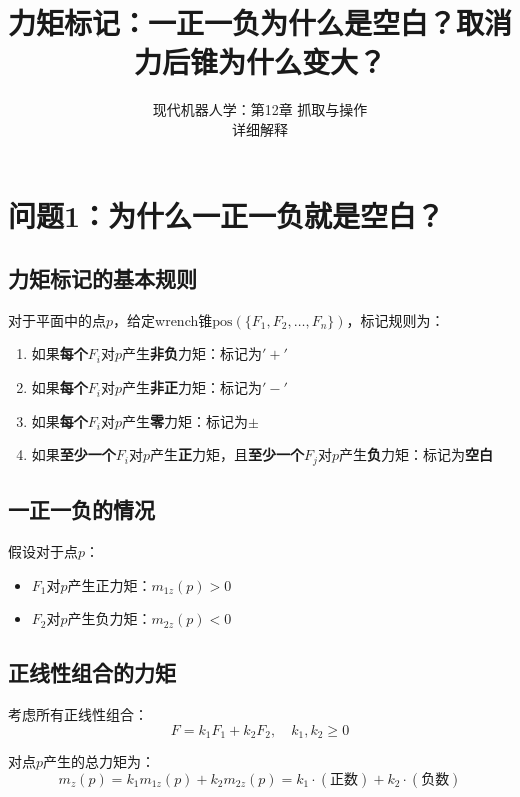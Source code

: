 \documentclass[12pt,a4paper]{article}
\title{力矩标记：一正一负为什么是空白？取消力后锥为什么变大？}
\author{现代机器人学：第12章 抓取与操作\\
详细解释}
\date{}
\begin{document}
\maketitle

\section{问题1：为什么一正一负就是空白？}

\subsection{力矩标记的基本规则}

对于平面中的点$p$，给定wrench锥$\text{pos}(\{F_1, F_2, \ldots, F_n\})$，标记规则为：

\begin{enumerate}
    \item 如果\textbf{每个}$F_i$对$p$产生\textbf{非负}力矩：标记为$'+'$
    \item 如果\textbf{每个}$F_i$对$p$产生\textbf{非正}力矩：标记为$'-'$
    \item 如果\textbf{每个}$F_i$对$p$产生\textbf{零}力矩：标记为$\pm$
    \item 如果\textbf{至少一个}$F_i$对$p$产生\textbf{正}力矩，且\textbf{至少一个}$F_j$对$p$产生\textbf{负}力矩：标记为\textbf{空白}
\end{enumerate}

\subsection{一正一负的情况}

假设对于点$p$：
\begin{itemize}
    \item $F_1$对$p$产生正力矩：$m_{1z}(p) > 0$
    \item $F_2$对$p$产生负力矩：$m_{2z}(p) < 0$
\end{itemize}

\subsection{正线性组合的力矩}

考虑所有正线性组合：
\begin{equation}
F = k_1 F_1 + k_2 F_2, \quad k_1, k_2 \geq 0
\end{equation}

对点$p$产生的总力矩为：
\begin{equation}
m_z(p) = k_1 m_{1z}(p) + k_2 m_{2z}(p) = k_1 \cdot (\text{正数}) + k_2 \cdot (\text{负数})
\end{equation}
\end{document}
